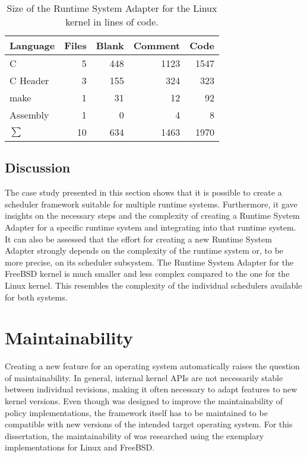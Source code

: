 \begin{table}[!t]
	\caption[Size of the Runtime System Adapter for the Linux kernel.]{Size of the Runtime System Adapter for the Linux kernel in lines of code.}%
	\label{tbl:adapter:linux}
	\begin{tabular}{lrrrr}\toprule
		Language & Files    & Blank     & Comment    & Code       \\ \midrule
		C        & \num{5}  & \num{448} & \num{1123} & \num{1547} \\
		C Header & \num{3}  & \num{155} & \num{324}  & \num{323}  \\
		make     & \num{1}  & \num{31}  & \num{12}   & \num{92}   \\
		Assembly & \num{1}  & \num{0}   & \num{4}    & \num{8}    \\ \midrule
		\(\sum\) & \num{10} & \num{634} & \num{1463} & \num{1970} \\ \bottomrule
	\end{tabular}
\end{table}

\subsection{Discussion}

The case study presented in this section shows that it is possible to create a scheduler framework suitable for multiple runtime systems. Furthermore, it gave insights on the necessary steps and the complexity of creating a Runtime System Adapter for a specific runtime system and integrating \cobas{} into that runtime system. It can also be assessed that the effort for creating a new Runtime System Adapter strongly depends on the complexity of the runtime system or, to be more precise, on its scheduler subsystem. The Runtime System Adapter for the FreeBSD kernel is much smaller and less complex compared to the one for the Linux kernel. This resembles the complexity of the individual schedulers available for both systems.

\section{Maintainability}%
\label{sec:studies:maintainability}

Creating a new feature for an operating system automatically raises the question of maintainability. In general, internal kernel \acp{API} are not necessarily stable between individual revisions, making it often necessary to adapt features to new kernel versions. Even though \cobas{} was designed to improve the maintainability of policy implementations, the framework itself has to be maintained to be compatible with new versions of the intended target operating system. For this dissertation, the maintainability of \cobas{} was researched using the exemplary implementations for Linux and FreeBSD.

